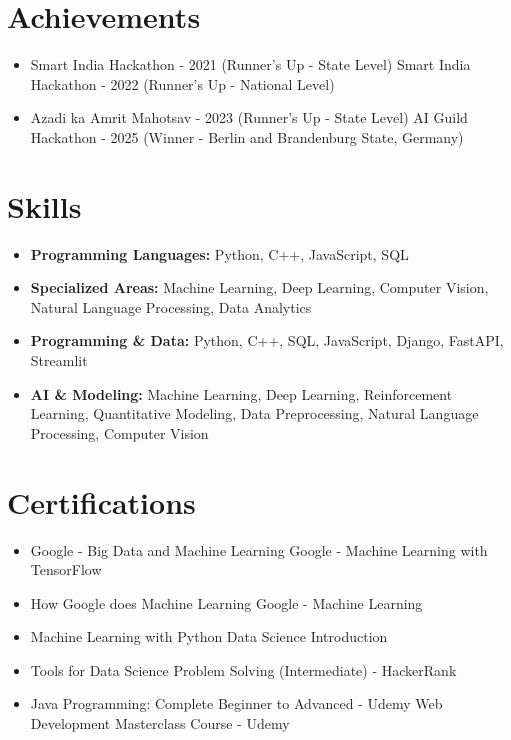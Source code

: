 \documentclass[a4paper,10pt]{article}
\begin{document}
\section*{Achievements}
\begin{itemize}
\item Smart India Hackathon - 2021 (Runner's Up - State Level) \hfill Smart India Hackathon - 2022 (Runner's Up - National Level)
\item Azadi ka Amrit Mahotsav - 2023 (Runner's Up - State Level) \hfill AI Guild Hackathon - 2025 (Winner - Berlin and Brandenburg State, Germany)
\end{itemize}

\section*{Skills}
\begin{itemize}
  \item \textbf{Programming Languages:} Python, C++, JavaScript, SQL
  \item \textbf{Specialized Areas:} Machine Learning, Deep Learning, Computer Vision, Natural Language Processing, Data Analytics
  \item \textbf{Programming \& Data:} Python, C++, SQL, JavaScript, Django, FastAPI, Streamlit
  \item \textbf{AI \& Modeling:} Machine Learning, Deep Learning, Reinforcement Learning, Quantitative Modeling, Data Preprocessing, Natural Language Processing, Computer Vision
\end{itemize}

\section*{Certifications}
\begin{itemize}
\item Google - Big Data and Machine Learning \hfill Google - Machine Learning with TensorFlow
\item How Google does Machine Learning \hfill Google - Machine Learning
\item Machine Learning with Python \hfill Data Science Introduction
\item Tools for Data Science \hfill Problem Solving (Intermediate) - HackerRank
\item Java Programming: Complete Beginner to Advanced - Udemy \hfill Web Development Masterclass Course - Udemy
\end{itemize}
\end{document}
